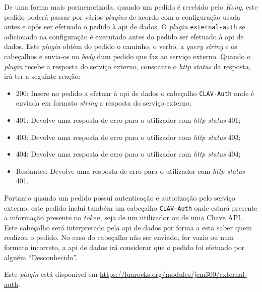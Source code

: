 De uma forma mais pormenorizada, quando um pedido é recebido pelo \textit{Kong}, este pedido poderá passar por vários \textit{plugins} de acordo com a configuração usada antes e após ser efetuado o pedido à \acrshort{api} de dados. O \textit{plugin} \texttt{external-auth} se adicionado na configuração é executado antes do pedido ser efetuado à \acrshort{api} de dados. Este \textit{plugin} obtém do pedido o caminho, o verbo, a \textit{query string} e os cabeçalhos e envia-os no \textit{body} dum pedido que faz ao serviço externo. Quando o \textit{plugin} recebe a resposta do serviço externo, consoante o \textit{\acrshort{http} status} da resposta, irá ter a seguinte reação:
\begin{itemize}
    \item 200: Insere no pedido a efetuar à \acrshort{api} de dados o cabeçalho \texttt{CLAV-Auth} onde é enviada em formato \textit{string} a resposta do serviço externo;
    \item 401: Devolve uma resposta de erro para o utilizador com \textit{\acrshort{http} status} 401;
    \item 403: Devolve uma resposta de erro para o utilizador com \textit{\acrshort{http} status} 403;
    \item 404: Devolve uma resposta de erro para o utilizador com \textit{\acrshort{http} status} 404;
    \item Restantes: Devolve uma resposta de erro para o utilizador com \textit{\acrshort{http} status} 401.

\end{itemize}

Portanto quando um pedido possui autenticação e autorização pelo serviço externo, este pedido inclui também um cabeçalho \texttt{CLAV-Auth} onde estará presente a informação presente no \textit{token}, seja de um utilizador ou de uma Chave API. Este cabeçalho será interpretado pela \acrshort{api} de dados por forma a esta saber quem realizou o pedido. No caso do cabeçalho não ser enviado, for vazio ou num formato incorreto, a \acrshort{api} de dados irá considerar que o pedido foi efetuado por alguém ``Desconhecido''.

Este \textit{plugin} está disponível em \url{https://luarocks.org/modules/jcm300/external-auth}.

